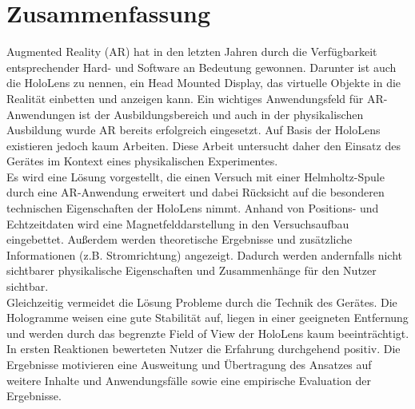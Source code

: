 \section*{Zusammenfassung}
Augmented Reality (AR) hat in den letzten Jahren durch die Verfügbarkeit entsprechender Hard- und Software an Bedeutung gewonnen. Darunter ist auch die HoloLens zu nennen, ein Head Mounted Display, das virtuelle Objekte in die Realität einbetten und anzeigen kann. Ein wichtiges Anwendungsfeld für AR-Anwendungen ist der Ausbildungsbereich und auch in der physikalischen Ausbildung wurde AR bereits erfolgreich eingesetzt. Auf Basis der HoloLens existieren jedoch kaum Arbeiten. Diese Arbeit untersucht daher den Einsatz des Gerätes im Kontext eines physikalischen Experimentes.\\
\noindent\hspace*{5mm}
Es wird eine Lösung vorgestellt, die einen Versuch mit einer Helmholtz-Spule durch eine AR-Anwendung erweitert und dabei Rücksicht auf die besonderen technischen Eigenschaften der HoloLens nimmt. Anhand von Positions- und Echtzeitdaten wird eine Magnetfelddarstellung in den Versuchsaufbau eingebettet. Außerdem werden theoretische Ergebnisse und zusätzliche Informationen (z.B. Stromrichtung) angezeigt. Dadurch werden andernfalls nicht sichtbarer physikalische Eigenschaften und Zusammenhänge für den Nutzer sichtbar.\\
\noindent\hspace*{5mm}
Gleichzeitig vermeidet die Lösung Probleme durch die Technik des Gerätes. Die Hologramme weisen eine gute Stabilität auf, liegen in einer geeigneten Entfernung und werden durch das begrenzte Field of View der HoloLens kaum beeinträchtigt. In ersten Reaktionen bewerteten Nutzer die Erfahrung durchgehend positiv. Die Ergebnisse motivieren eine Ausweitung und Übertragung des Ansatzes auf weitere Inhalte und Anwendungsfälle sowie eine empirische Evaluation der Ergebnisse.

